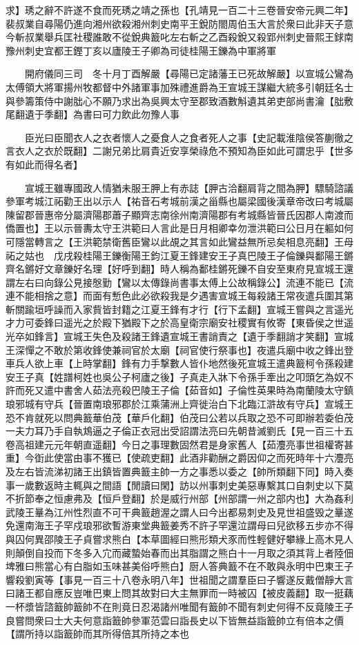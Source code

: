 求】琇之辭不許遂不食而死琇之靖之孫也【孔靖見一百二十三卷晉安帝元興二年】裴叔業自尋陽仍進向湘州欲殺湘州刺史南平王銳防閤周伯玉大言於衆曰此非天子意今斬叔業舉兵匡社稷誰敢不從銳典籖叱左右斬之乙酉殺銳又殺郢州刺史晉熙王銶南豫州刺史宜都王鏗丁亥以廬陵王子卿為司徒桂陽王鑠為中軍將軍

　　開府儀同三司　冬十月丁酉解嚴【尋陽已定諸藩王已死故解嚴】以宣城公鸞為太傅領大將軍揚州牧都督中外諸軍事加殊禮進爵為王宣城王謀繼大統多引朝廷名士與參籌策侍中謝朏心不願乃求出為吳興太守至郡致酒數斛遺其弟吏部尚書瀹【朏敷尾翻遺于季翻】為書曰可力飲此勿豫人事

　　臣光曰臣聞衣人之衣者懷人之憂食人之食者死人之事【史記載淮陰侯答蒯徹之言衣人之衣於既翻】二謝兄弟比肩貴近安享榮祿危不預知為臣如此可謂忠乎【世多有如此而得名者】

　　宣城王雖專國政人情猶未服王胛上有赤誌【胛古洽翻肩背之間為胛】驃騎諮議參軍考城江祏勸王出以示人【祐音石考城前漢之甾縣也屬梁國後漢章帝改曰考城屬陳留郡晉惠帝分屬濟陽郡蕭子顯齊志南徐州南濟陽郡有考城縣皆晉氏因郡人南渡而僑置也】王以示晉夀太守王洪範曰人言此是日月相卿幸勿泄洪範曰公日月在軀如何可隱當轉言之【王洪範禁衛舊臣鸞以此覘之其言如此鸞益無所忌矣相息亮翻】王母祏之姑也　戊戌殺桂陽王鑠衡陽王鈞江夏王鋒建安王子真巴陵王子倫鑠與鄱陽王鏘齊名鏘好文章鑠好名理【好呼到翻】時人稱為鄱桂鏘死鑠不自安至東府見宣城王還謂左右曰向錄公見接慇勤【鸞以太傳錄尚書事太傅上公故稱錄公】流連不能已【流連不能相捨之意】而面有慙色此必欲殺我是夕遇害宣城王每殺諸王常夜遣兵圍其第斬關踰垣呼譟而入家貲皆封籍之江夏王鋒有才行【行下孟翻】宣城王嘗與之言遥光才力可委鋒曰遥光之於殿下猶殿下之於高皇衛宗廟安社稷實有攸寄【東昏侯之世遥光卒如鋒言】宣城王失色及殺諸王鋒遺宣城王書誚責之【遺于季翻誚才笑翻】宣城王深憚之不敢於第收鋒使兼祠官於太廟【祠官使行祭事也】夜遣兵廟中收之鋒出登車兵人欲上車【上時掌翻】鋒有力手撃數人皆仆地然後死宣城王遣典籖柯令孫殺建安王子真【姓譜柯姓也吳公子柯廬之後】子真走入牀下令孫手牽出之叩頭乞為奴不許而死又遣中書舍人茹法亮殺巴陵王子倫【茹音如】子倫性英果時為南蘭陵太守鎮琅邪城有守兵【晉置南琅邪郡於江乘蒲洲上齊徙治白下北臨江滸故有守兵】宣城王恐不肯就死以問典籖華伯茂【華戶化翻】伯茂曰公若以兵取之恐不可即辦若委伯茂一夫力耳乃手自執鴆逼之子倫正衣冠出受詔謂法亮曰先朝昔滅劉氏【見一百三十五卷高祖建元元年朝直遥翻】今日之事理數固然君是身家舊人【茹灋亮事世祖權寄甚重】今衘此使當由事不獲已【使疏吏翻】此酒非勸酬之爵因仰之而死時年十六灋亮及左右皆流涕初諸王出鎮皆置典籖主帥一方之事悉以委之【帥所類翻下同】時入奏事一歲數返時主輒與之間語【閒讀曰閑】訪以州事刺史美惡專繫其口自刺史以下莫不折節奉之恒慮弗及【恒戶登翻】於是威行州部【州部謂一州之部内也】大為姦利武陵王曅為江州性烈直不可干典籖趙渥之謂人曰今出都易刺史及見世祖盛毁之曅遂免還南海王子罕戍琅邪欲暫游東堂典籖姜秀不許子罕還泣謂母曰兒欲移五步亦不得與囚何異邵陵王子貞嘗求熊白【本草圖經曰熊形類犬豕而性輕健好攀緣上高木見人則顛倒自投而下冬多入宂而藏蟄始春而出其脂謂之熊白十一月取之須其背上者陸佃埤雅曰熊當心有白脂如玉味甚美俗呼熊白】厨人答典籖不在不敢與永明中巴東王子響殺劉寅等【事見一百三十八卷永明八年】世祖聞之謂羣臣曰子響遂反戴僧靜大言曰諸王都自應反豈唯巴東上問其故對曰大主無罪而一時被囚【被皮義翻】取一挺藕一杯漿皆諮籖帥籖帥不在則竟日忍渴諸州唯聞有籖帥不聞有刺史何得不反竟陵王子良嘗問衆曰士大夫何意詣籖帥參軍范雲曰詣長史以下皆無益詣籖帥立有倍本之價【謂所持以詣籖帥而其所得倍其所持之本也